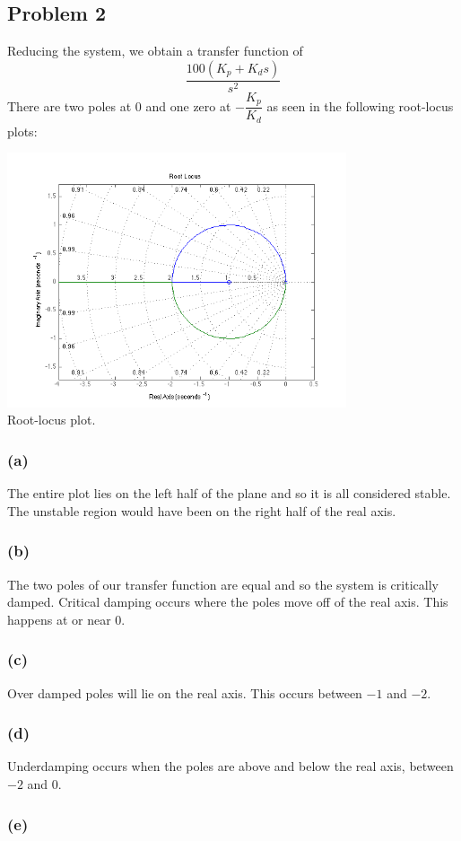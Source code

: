 \documentclass[letterpaper,10pt]{article}
\begin{document}
\subsection*{Problem 2}
Reducing the system, we obtain a transfer function of
$$\dfrac{100(K_{p}+K_{d}s)}{s^{2}}$$
There are two poles at 0 and one zero at $-\dfrac{K_{p}}{K_{d}}$ as seen in the following root-locus plots:
\begin{center}
	\includegraphics[width=0.75\textwidth]{homework04-6-2a.png} \\
	Root-locus plot.
\end{center}
\subsubsection*{(a)}
The entire plot lies on the left half of the plane and so it is all considered stable.  The unstable region would have been on the right half of the real axis.
\subsubsection*{(b)}
The two poles of our transfer function are equal and so the system is critically damped.  Critical damping occurs where the poles move off of the real axis.  This happens at or near 0.
\subsubsection*{(c)}
Over damped poles will lie on the real axis.  This occurs between $-1$ and $-2$.
\subsubsection*{(d)}
Underdamping occurs when the poles are above and below the real axis, between $-2$ and 0.
\subsubsection*{(e)}
\end{document}
